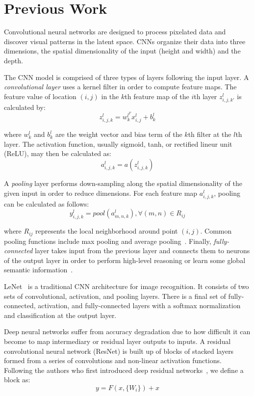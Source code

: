 \section{Previous Work}

Convolutional neural networks are designed to process pixelated data and discover visual patterns in the latent space. CNNs organize their data into three dimensions, the spatial dimensionality of the input (height and width) and the depth.

The CNN model is comprised of three types of layers following the input layer. A \textit{convolutional layer} uses a kernel filter in order to compute feature maps. The feature value of location $(i, j)$ in the $k$th feature map of the $i$th layer $z^l_{i, j, k'}$ is calculated by:
\begin{equation}
    z^l_{i, j, k} = w^{l^{T}}_kx^l_{i, j} + b^l_k
\end{equation}

where $w_k^l$ and $b_k^l$ are the weight vector and bias term of the $k$th filter at the $l$th layer. The activation function, usually sigmoid, tanh, or rectified lineur unit (ReLU), may then be calculated as:
\begin{equation}
    a^l_{i, j, k} = a(z^l_{i, j, k})
\end{equation}

A \textit{pooling} layer performs down-sampling along the spatial dimensionality of the given input in order to reduce dimensions. For each feature map $a^l_{i, j, k}$, pooling can be calculated as follows:
\begin{equation}
    y^l_{i, j, k} = pool(a^l_{m, n, k}), \forall(m, n) \in R_{ij}
\end{equation}

where $R_{ij}$ represents the local neighborhood around point $(i,j)$. Common pooling functions include max pooling and average pooling~\cite{gu2018recent}. Finally, \textit{fully-connected} layer takes input from the previous layer and connects them to neurons of the output layer in order to perform high-level reasoning or learn some global semantic information~\cite{OShea2015AnIT}.

LeNet~\cite{lenet} is a traditional CNN architecture for image recognition. It consists of two sets of convolutional, activation, and pooling layers. There is a final set of fully-connected, activation, and fully-connected layers with a softmax normalization and classification at the output layer.

Deep neural networks suffer from accuracy degradation due to how difficult it can become to map intermediary or residual layer outputs to inputs. A residual convolutional neural network (ResNet) is built up of blocks of stacked layers formed from a series of convolutions and non-linear activation functions. Following the authors who first introduced deep residual networks~\cite{resnet}, we define a block as:
\begin{equation}
    y = F(x, \{W_i\}) + x
\end{equation}

